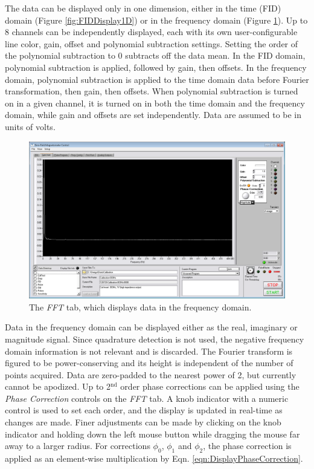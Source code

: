 \documentclass[PaulGanssle-Thesis.tex]{subfiles}
\begin{document}
The data can be displayed only in one dimension, either in the time (FID) domain (Figure \ref{fig:FIDDisplay1D}) or in the frequency domain (Figure \ref{fig:FFTDisplay1D}). Up to 8 channels can be independently displayed, each with its own user-configurable line color, gain, offset and polynomial subtraction settings. Setting the order of the polynomial subtraction to 0 subtracts off the data mean. In the FID domain, polynomial subtraction is applied, followed by gain, then offsets. In the frequency domain, polynomial subtraction is applied to the time domain data before Fourier transformation, then gain, then offsets. When polynomial subtraction is turned on in a given channel, it is turned on in both the time domain and the frequency domain, while gain and offsets are set independently. Data are assumed to be in units of volts.

\begin{figure}[!h]
\includegraphics[width=\textwidth]{figures/console/FFTDisplay1D.png}
\caption{The \textit{FFT} tab, which displays data in the frequency domain.}
\label{fig:FFTDisplay1D}
\end{figure}

Data in the frequency domain can be displayed either as the real, imaginary or magnitude signal. Since quadrature detection is not used, the negative frequency domain information is not relevant and is discarded. The Fourier transform is figured to be power-conserving and its height is independent of the number of points acquired. Data are zero-padded to the nearest power of 2, but currently cannot be apodized. Up to 2$^\mathrm{nd}$ order phase corrections can be applied using the \textit{Phase Correction} controls on the  \textit{FFT} tab. A knob indicator with a numeric control is used to set each order, and the display is updated in real-time as changes are made. Finer adjustments can be made by clicking on the knob indicator and holding down the left mouse button while dragging the mouse far away to a larger radius. For corrections $\phi_{0}$, $\phi_{1}$ and $\phi_{2}$, the phase correction is applied as an element-wise multiplication by Eqn. \ref{eqn:DisplayPhaseCorrection}.
\end{document}
